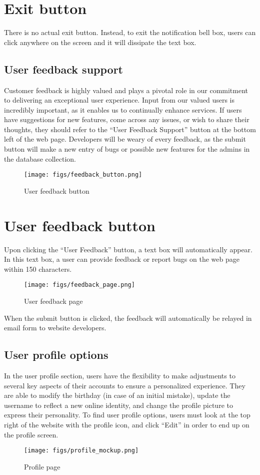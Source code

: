 \documentclass[conference]{IEEEtran}
\begin{document}
\section*{Exit button}
There is no actual exit button. Instead, to exit the notification bell box, users can click anywhere on the screen and it will dissipate the text box. 
\subsection{User feedback support}
Customer feedback is highly valued and plays a pivotal role in our commitment to delivering an exceptional user experience. Input from our valued users is incredibly important, as it enables us to continually enhance services. If users have suggestions for new features, come across any issues, or wish to share their thoughts, they should refer to the “User Feedback Support” button at the bottom left of the web page. Developers will be weary of every feedback, as the submit button will make a new entry of bugs or possible new features for the admins in the database collection. 
\begin{figure}[H]
\centering
\texttt{[image: figs/feedback\_button.png]}
\caption{User feedback button}
\label{fig:User feedback button}
\end{figure}
\section*{User feedback button}
Upon clicking the “User Feedback” button, a text box will automatically appear. In this text box, a user can provide feedback or report bugs on the web page within 150 characters.
\begin{figure}[H]
\centering
\texttt{[image: figs/feedback\_page.png]}
\caption{User feedback page}
\label{fig:User feedback page}
\end{figure}
When the submit button is clicked, the feedback will automatically be relayed in email form to website developers.
\subsection{User profile options}
In the user profile section, users have the flexibility to make adjustments to several key aspects of their accounts to ensure a personalized experience. They are able to modify the birthday (in case of an initial mistake), update the username to reflect a new online identity, and change the profile picture to express their personality. To find user profile options, users must look at the top right of the website with the profile icon, and click “Edit” in order to end up on the profile screen.
\begin{figure}[H]
\centering
\texttt{[image: figs/profile\_mockup.png]}
\caption{Profile page}
\label{fig:Profile mockup}
\end{figure}
\end{document}
